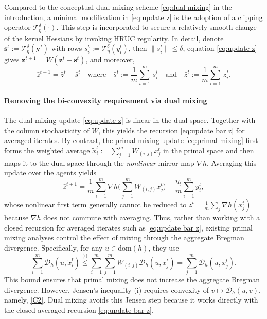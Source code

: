 \documentclass{article}
\theoremstyle{plain}
\theoremstyle{definition}
\theoremstyle{remark}
\newcommand{\clip}{\mathcal{T}^\delta_\eta}
\newcommand{\cD}{\mathcal{D}_{h}}
\newcommand{\bs}{\mathbf{s}}
\newcommand{\by}{\mathbf{y}}
\newcommand{\bz}{\mathbf{z}}
\newcommand{\dom}[1]{\mathrm{dom}(#1)}
\begin{document}
Compared to the conceptual dual mixing scheme \eqref{eq:dual-mixing} in the introduction, a minimal modification in \eqref{eq:update z} is the adoption of a clipping operator $\clip(\cdot)$. This step is incorporated to secure a relatively smooth change of the kernel Hessians by invoking HRUC regularity. In detail, denote $\bs^t:=\clip(\by^t)$ with  rows $s_i^t:= \clip(y^t_i)$, then $\|s_i^t\|\leq \delta$, equation \eqref{eq:update z} gives $\bz^{t+1} = W (\bz^t - \bs^t)$, and moreover,
\begin{equation}\label{eq:update bar z}
\bar z^{t+1} = \bar z^t - \bar s^t
\quad \text{where} \quad \bar s^t:=\frac1m{\sum}_{i=1}^m \,s_i^t\quad \text{and} \quad \bar z^t:=\frac1m{\sum}_{i=1}^m \,z_i^t.    
\end{equation}

\paragraph{Removing the bi-convexity requirement via dual mixing}
The dual mixing update \eqref{eq:update z} is linear in the dual space. Together with the column stochasticity of $W$, this yields the recursion \eqref{eq:update bar z} for averaged iterates. By contrast, the primal mixing update \eqref{eq:primal-mixing} first forms the weighted average $\tilde x_i^t:=\sum_{j=1}^mW_{(i,j)}x_j^t$ in the primal space and then maps it to the dual space through the \emph{nonlinear} mirror map $\nabla h$. Averaging this update over the agents yields
\[
\bar z^{t+1}
=\frac1m{\sum}_{i=1}^m\nabla h\Big({\sum}_{j=1}^mW_{(i,j)}x_j^t\Big)
-\frac{\eta_t}{m}{\sum}_{i=1}^m y_i^t,
\]
whose nonlinear first term generally cannot be reduced to $\bar z^t=\frac1m\sum_j\nabla h(x_j^t)$ because $\nabla h$ does not commute with averaging. Thus, rather than working with a closed recursion for averaged iterates such as \eqref{eq:update bar z}, existing primal mixing analyses \cite{li2016distributed,yuan2018optimal,fang2024gossip} control the effect of mixing through the aggregate Bregman divergence. Specifically, for any $u\in\dom{h}$, they use
\[
{\sum}_{i=1}^m\cD(u,\tilde x_i^t)
\overset{\text{(i)}}{\leq} {\sum}_{i=1}^m{\sum}_{j=1}^mW_{(i,j)}\cD(u,x_j^t)
= {\sum}_{j=1}^m\cD(u,x_j^t).
\]
This bound ensures that primal mixing does not increase the aggregate Bregman divergence. However, Jensen's inequality (i) requires convexity of $v\mapsto\cD(u,v)$, namely, \ref{C2}. Dual mixing avoids this Jensen step because it works directly with the closed averaged recursion \eqref{eq:update bar z}.
 
\end{document}
